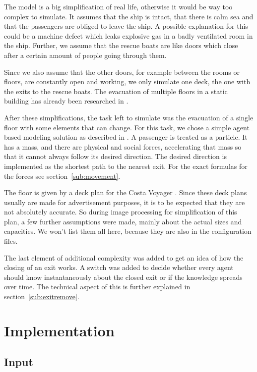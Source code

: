 \documentclass[11pt]{article}
\begin{document}
The model is a big simplification of real life, otherwise it would be way too
complex to simulate.  It assumes that the ship is intact, that there is calm
sea and that the passengers are obliged to leave the ship.  A possible
explanation for this could be a machine defect which leaks explosive gas in a
badly ventilated room in the ship.  Further, we assume that the rescue boats are
like doors which close after a certain amount of people going through them. 

Since we also assume that the other doors, for example between the rooms or
floors, are constantly open and working, we only simulate one deck, the one
with the exits to the rescue boats.  The evacuation of multiple floors in a
static building has already been researched in \cite{multilevel}. 

After these simplifications, the task left to simulate was the evacuation of a
single floor with some elements that can change.  For this task, we chose a
simple agent based modeling solution as described in \cite{helbing}.  A
passenger is treated as a particle.  It has a mass, and there are physical and
social forces, accelerating that mass so that it cannot always follow its
desired direction.  The desired direction is implemented as the shortest path
to the nearest exit.  For the exact formulas for the forces see
section~\ref{sub:movement}.

The floor is given by a deck plan for the Costa Voyager \cite{costa}. Since
these deck plans usually are made for advertisement purposes, it is to be
expected that they are not absolutely accurate.  So during image processing for
simplification of this plan, a few further assumptions were made, mainly about
the actual sizes and capacities.  We won't list them all here, because they are
also in the configuration files. 

The last element of additional complexity was added to get an idea of how the
closing of an exit works.  A switch was added to decide whether every agent
should know instantaneously about the closed exit or if the knowledge spreads
over time.  The technical aspect of this is further explained in
section~\ref{sub:exitremove}.

\section{Implementation}

\subsection{Input}
\end{document}
